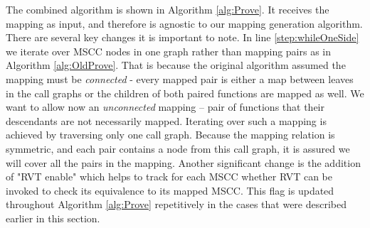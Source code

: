 The combined algorithm is shown in Algorithm \ref{alg:Prove}. It receives the mapping as input, and therefore is agnostic to our mapping generation algorithm. There are several key changes it is important to note. In line \ref{step:whileOneSide} we iterate over MSCC nodes in one graph rather than mapping pairs as in Algorithm \ref{alg:OldProve}. That is because the original algorithm assumed the mapping must be \emph{connected} - every mapped pair is either a map between leaves in the call graphs or the children of both paired functions are mapped as well. We want to allow now an \emph{unconnected} mapping – pair of functions that their descendants are not necessarily mapped. Iterating over such a mapping is achieved by traversing only one call graph. Because the mapping relation is symmetric, and each pair contains a node from this call graph, it is assured we will cover all the pairs in the mapping. Another significant change is the addition of "RVT enable" which helps to track for each MSCC whether RVT can be invoked to check its equivalence to its mapped MSCC. This flag is updated throughout Algorithm \ref{alg:Prove} repetitively in the cases that were described earlier in this section.  

